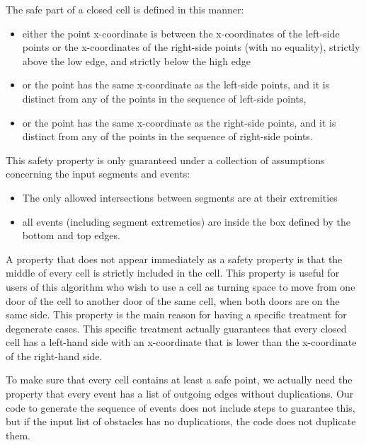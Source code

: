 \documentclass[a4paper, USenglish, cleveref, autoref, thm-restate]{lipics-v2021}
\begin{document}
The safe part of a closed cell is defined in this manner:
\begin{itemize}
\item either the point x-coordinate is between the x-coordinates of
  the left-side points or the x-coordinates of the right-side points
  (with no equality), strictly above the low edge, and strictly below
  the high edge
\item or the point has the same x-coordinate as the left-side points,
  and it is distinct from any of the points in the sequence of
  left-side points,
\item or the point has the same x-coordinate as the right-side points,
  and it is distinct from any of the points in the sequence of
  right-side points.
\end{itemize}

This safety property is only guaranteed under a collection of
assumptions concerning the input segments and events:
\begin{itemize}
\item The only allowed intersections between segments are at their
  extremities
\item all events (including segment extremeties) are inside the box
 defined by the bottom and top edges.
\end{itemize}

A property that does not appear immediately as a safety property is
that the middle of every cell is strictly included in the cell.  This
property is useful for users of this algorithm who wish to use a cell
as turning space to move from one door of the cell to another door of
the same cell, when both doors are on the same side.  This property is
the main reason for having a specific treatment for degenerate cases.
This specific treatment actually guarantees that every closed cell has
a left-hand side with an x-coordinate that is lower than the
x-coordinate of the right-hand side.

To make sure that every cell contains at least a safe point, we
actually need the property that every event has a list of outgoing
edges without duplications.  Our code to generate the sequence of
events does not include steps to guarantee this, but if the input
list of obstacles has no duplications, the code does not duplicate them.
\end{document}
